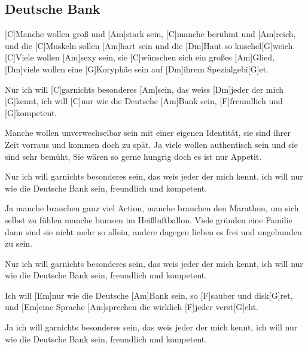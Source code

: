 \subsection*{Deutsche Bank   }
\begin{guitar}

[C]Manche wollen groß und [Am]stark sein, [C]manche berühmt und [Am]reich,
und die [C]Muskeln sollen [Am]hart sein und die [Dm]Haut so kuschel[G]weich.
[C]Viele wollen [Am]sexy sein, sie [C]wünschen sich ein großes [Am]Glied,
[Dm]viele wollen eine [G]Koryphäe sein auf [Dm]ihrem Spezialgebi[G]et.



Nur ich will [C]garnichts besonderes [Am]sein, das weiss [Dm]jeder der mich [G]kennt,
ich will [C]nur wie die Deutsche [Am]Bank sein, [F]freundlich und [G]kompetent.



Manche wollen unverwechselbar sein mit einer eigenen Identität,
sie sind ihrer Zeit vorraus und kommen doch zu spät.
Ja viele wollen authentisch sein und sie sind sehr bemüht,
Sie wären so gerne hungrig doch es ist nur Appetit.



Nur ich will garnichts besonderes sein, das weis jeder der mich kennt,
ich will nur wie die Deutsche Bank sein, freundlich und kompetent.



Ja manche brauchen ganz viel Action, manche brauchen den Marathon,
um sich selbst zu fühlen manche bumsen im Heißluftballon.
Viele gründen eine Familie dann sind sie nicht mehr so allein,
andere dagegen lieben es frei und ungebunden zu sein.



Nur ich will garnichts besonderes sein, das weis jeder der mich kennt,
ich will nur wie die Deutsche Bank sein, freundlich und kompetent.



Ich will [Em]nur wie die Deutsche [Am]Bank sein, so [F]sauber und disk[G]ret,
und [Em]eine Sprache [Am]sprechen die wirklich [F]jeder verst[G]eht.



Ja ich will garnichts besonderes sein, das weis jeder der mich kennt,
ich will nur wie die Deutsche Bank sein, freundlich und kompetent.

\end{guitar}
